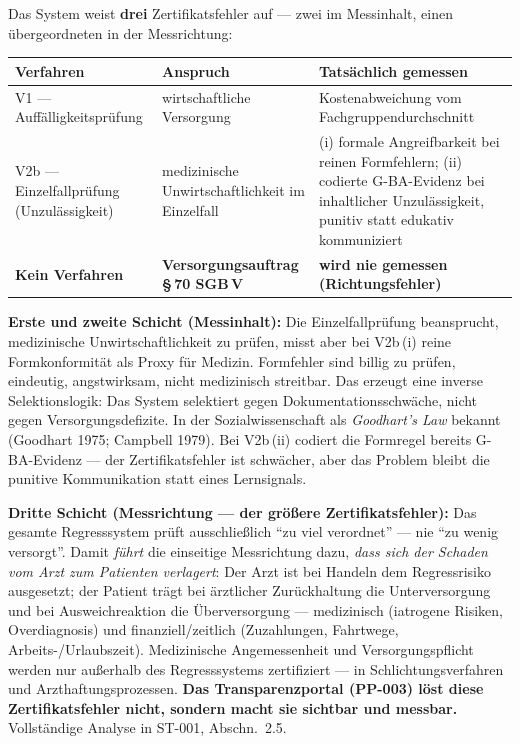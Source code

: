 \documentclass{umbruch-position}
\begin{document}
Das System weist \textbf{drei} Zertifikatsfehler auf --- zwei im Messinhalt, einen übergeordneten in der Messrichtung:

{\small
\begin{tabularx}{\textwidth}{X X X}
\toprule
\textbf{Verfahren} & \textbf{Anspruch} & \textbf{Tatsächlich gemessen} \\
\midrule
V1 --- Auffälligkeitsprüfung & wirtschaftliche Versorgung & Kostenabweichung vom Fachgruppendurchschnitt \\
V2b --- Einzelfallprüfung (Unzulässigkeit) & medizinische Unwirtschaftlichkeit im Einzelfall & (i) formale Angreifbarkeit bei reinen Formfehlern; (ii) codierte G-BA-Evidenz bei inhaltlicher Unzulässigkeit, punitiv statt edukativ kommuniziert \\
\midrule
\textbf{Kein Verfahren} & \textbf{Versorgungsauftrag \S\,70 SGB\,V} & \textbf{wird nie gemessen (Richtungsfehler)} \\
\bottomrule
\end{tabularx}
}

\textbf{Erste und zweite Schicht (Messinhalt):} Die Einzelfallprüfung beansprucht, medizinische Unwirtschaftlichkeit zu prüfen, misst aber bei V2b\,(i) reine Formkonformität als Proxy für Medizin. Formfehler sind billig zu prüfen, eindeutig, angstwirksam, nicht medizinisch streitbar. Das erzeugt eine inverse Selektionslogik: Das System selektiert gegen Dokumentationsschwäche, nicht gegen Versorgungsdefizite. In der Sozialwissenschaft als \textit{Goodhart's Law} bekannt (Goodhart 1975; Campbell 1979). Bei V2b\,(ii) codiert die Formregel bereits G-BA-Evidenz --- der Zertifikatsfehler ist schwächer, aber das Problem bleibt die punitive Kommunikation statt eines Lernsignals.

\textbf{Dritte Schicht (Messrichtung --- der größere Zertifikatsfehler):} Das gesamte Regresssystem prüft ausschließlich ``zu viel verordnet'' --- nie ``zu wenig versorgt''. Damit \emph{führt} die einseitige Messrichtung dazu, \emph{dass sich der Schaden vom Arzt zum Patienten verlagert}: Der Arzt ist bei Handeln dem Regressrisiko ausgesetzt; der Patient trägt bei ärztlicher Zurückhaltung die Unterversorgung und bei Ausweichreaktion die Überversorgung --- medizinisch (iatrogene Risiken, Overdiagnosis) und finanziell/zeitlich (Zuzahlungen, Fahrtwege, Arbeits-/Urlaubszeit). Medizinische Angemessenheit und Versorgungspflicht werden nur außerhalb des Regresssystems zertifiziert --- in Schlichtungsverfahren und Arzthaftungsprozessen. \textbf{Das Transparenzportal (PP-003) löst diese Zertifikatsfehler nicht, sondern macht sie sichtbar und messbar.} Vollständige Analyse in ST-001, Abschn.~2.5.
\end{document}
